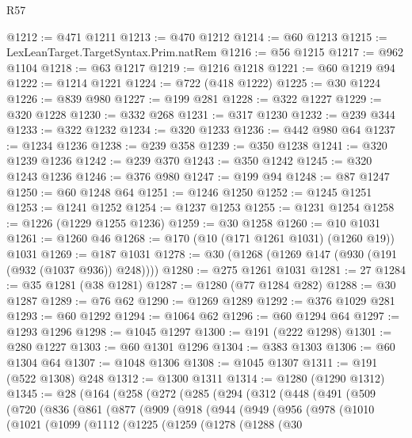 \begin{lexlean}{R57}
\begin{coremodule}
@1212 := @471 @1211
@1213 := @470 @1212
@1214 := @60 @1213
@1215 := LexLeanTarget.TargetSyntax.Prim.natRem
@1216 := @56 @1215
@1217 := @962 @1104
@1218 := @63 @1217
@1219 := @1216 @1218
@1221 := @60 @1219 @94
@1222 := @1214 @1221
@1224 := @722 (@418 @1222)
@1225 := @30 @1224
@1226 := @839 @980
@1227 := @199 @281
@1228 := @322 @1227
@1229 := @320 @1228
@1230 := @332 @268
@1231 := @317 @1230
@1232 := @239 @344
@1233 := @322 @1232
@1234 := @320 @1233
@1236 := @442 @980 @64
@1237 := @1234 @1236
@1238 := @239 @358
@1239 := @350 @1238
@1241 := @320 @1239 @1236
@1242 := @239 @370
@1243 := @350 @1242
@1245 := @320 @1243 @1236
@1246 := @376 @980
@1247 := @199 @94
@1248 := @87 @1247
@1250 := @60 @1248 @64
@1251 := @1246 @1250
@1252 := @1245 @1251
@1253 := @1241 @1252
@1254 := @1237 @1253
@1255 := @1231 @1254
@1258 := @1226 (@1229 @1255 @1236)
@1259 := @30 @1258
@1260 := @10 @1031
@1261 := @1260 @46
@1268 := @170 (@10 (@171 @1261 @1031) (@1260 @19)) @1031
@1269 := @187 @1031
@1278 := @30 (@1268 (@1269 @147 (@930 (@191 (@932 (@1037 @936)) @248))))
@1280 := @275 @1261 @1031
@1281 := 27
@1284 := @35 @1281 (@38 @1281)
@1287 := @1280 (@77 @1284 @282)
@1288 := @30 @1287
@1289 := @76 @62
@1290 := @1269 @1289
@1292 := @376 @1029 @281
@1293 := @60 @1292
@1294 := @1064 @62
@1296 := @60 @1294 @64
@1297 := @1293 @1296
@1298 := @1045 @1297
@1300 := @191 (@222 @1298)
@1301 := @280 @1227
@1303 := @60 @1301 @1296
@1304 := @383 @1303
@1306 := @60 @1304 @64
@1307 := @1048 @1306
@1308 := @1045 @1307
@1311 := @191 (@522 @1308) @248
@1312 := @1300 @1311
@1314 := @1280 (@1290 @1312)
@1345 := @28
    (@164
      (@258
        (@272
          (@285
            (@294
              (@312
                (@448
                  (@491
                    (@509
                      (@720
                        (@836
                          (@861
                            (@877
                              (@909
                                (@918
                                  (@944
                                    (@949
                                      (@956
                                        (@978
                                          (@1010
                                            (@1021
                                              (@1099
                                                (@1112
                                                  (@1225
                                                    (@1259
                                                      (@1278
                                                        (@1288
                                                          (@30

\end{coremodule}
\end{lexlean}
